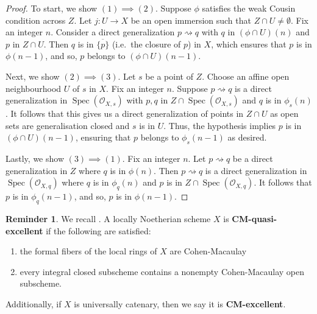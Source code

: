 \documentclass[11pt]{amsart}
\theoremstyle{plain}
\theoremstyle{definition}
\newtheorem{reminder}[theorem]{Reminder}
\numberwithin{equation}{section}
\numberwithin{theorem}{section}
\begin{document}
\begin{proof}
    To start, we show $(1)\implies (2)$. Suppose $\phi$ satisfies the weak Cousin condition across $Z$. Let $j \colon U \to X$ be an open immersion such that $Z\cap U\not= \emptyset$. Fix an integer $n$. Consider a direct generalization  $p \rightsquigarrow q$ with $q$ in $( \phi \cap U)(n)$ and $p$ in $Z\cap U$. Then $q$ is in $\overline{\{p  \}}$ (i.e.\ the closure of $p$) in $X$, which ensures that $p$ is in $\phi (n-1)$, and so, $p$ belongs to $( \phi \cap U)(n-1)$. 

    Next, we show $(2)\implies (3)$. Let $s$ be a point of $Z$. Choose an affine open neighbourhood $U$ of $s$ in $X$. Fix an integer $n$. Suppose $p \rightsquigarrow q$ is a direct generalization  in $\operatorname{Spec}(\mathcal{O}_{X,s})$ with $p,q$ in $Z \cap \operatorname{Spec}(\mathcal{O}_{X,s})$ and $q$ is in $\phi_s(n)$. It follows that this gives us a direct generalization  of points in $Z\cap U$ as open sets are generalisation closed and $s$ is in $U$. Thus, the hypothesis implies $p$ is in $( \phi \cap U)(n-1)$, ensuring that $p$ belongs to $\phi_s(n-1)$ as desired.

    Lastly, we show $(3)\implies (1)$. Fix an integer $n$. Let $p \rightsquigarrow q$ be a direct generalization  in $Z$ where $q$ is in $\phi(n)$. Then $p \rightsquigarrow q$ is a direct generalization  in $\operatorname{Spec}(\mathcal{O}_{X,q})$ where $q$ is in $\phi_q(n)$ and $p$ is in $Z\cap \operatorname{Spec}(\mathcal{O}_{X,q})$. It follows that $p$ is in $\phi_q (n-1)$, and so, $p$ is in $\phi (n-1)$.
\end{proof}

\begin{reminder}\label{rmk:cm_excellent}
    We recall \cite[Definition 1.2]{Cesnavicius:2021}. A locally Noetherian scheme $X$ is \textbf{CM-quasi-excellent} if the following are satisfied:
    \begin{enumerate}
        \item the formal fibers of the local rings of $X$ are Cohen-Macaulay 
        \item every integral closed subscheme contains a nonempty Cohen-Macaulay open subscheme. 
    \end{enumerate}
    Additionally, if $X$ is universally catenary, then we say it is \textbf{CM-excellent}.
\end{reminder} 
\end{document}
